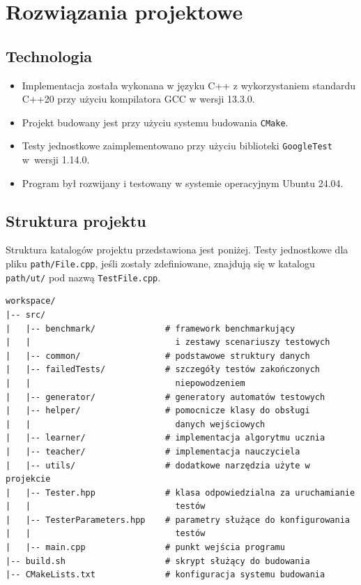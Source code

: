\chapter{Rozwiązania projektowe}

\section{Technologia}

\begin{itemize}
    \item Implementacja została wykonana w języku C++ z wykorzystaniem standardu C++20 przy użyciu kompilatora GCC w wersji 13.3.0.
    \item Projekt budowany jest przy użyciu systemu budowania \texttt{CMake}.
    \item Testy jednostkowe zaimplementowano przy użyciu biblioteki \texttt{GoogleTest} w~wersji 1.14.0.
    \item Program był rozwijany i testowany w systemie operacyjnym Ubuntu 24.04.
\end{itemize}

\clearpage
\section{Struktura projektu}

Struktura katalogów projektu przedstawiona jest poniżej. Testy jednostkowe dla pliku \texttt{path/File.cpp}, jeśli zostały zdefiniowane,
znajdują się w katalogu \texttt{path/ut/} pod nazwą \texttt{TestFile.cpp}.

\begin{verbatim}
workspace/
|-- src/
|   |-- benchmark/              # framework benchmarkujący 
|   |                             i zestawy scenariuszy testowych
|   |-- common/                 # podstawowe struktury danych
|   |-- failedTests/            # szczegóły testów zakończonych
|   |                             niepowodzeniem
|   |-- generator/              # generatory automatów testowych
|   |-- helper/                 # pomocnicze klasy do obsługi 
|   |                             danych wejściowych
|   |-- learner/                # implementacja algorytmu ucznia
|   |-- teacher/                # implementacja nauczyciela
|   |-- utils/                  # dodatkowe narzędzia użyte w projekcie
|   |-- Tester.hpp              # klasa odpowiedzialna za uruchamianie
|   |                             testów
|   |-- TesterParameters.hpp    # parametry służące do konfigurowania
|   |                             testów
|   |-- main.cpp                # punkt wejścia programu
|-- build.sh                    # skrypt służący do budowania
|-- CMakeLists.txt              # konfiguracja systemu budowania
\end{verbatim}

